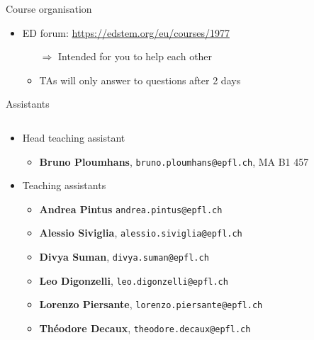 \begin{frame}{Course organisation}
\begin{itemize}
        \vspace{1em}
        \item \alert{ED forum:} \url{https://edstem.org/eu/courses/1977}
            \begin{itemize}
                \vspace{-0.2em}
                \item[$\Rightarrow$] Intended for you to help each other
                \vspace{-0.2em}
                \item TAs will only answer to questions after 2 days
            \end{itemize}
    \end{itemize}
\end{frame}

\begin{frame}{Assistants}
    \begin{columns}
    \begin{column}{1.1\textwidth}
    \begin{itemize}
        \item Head teaching assistant
            \begin{itemize}
                \item \textbf{Bruno Ploumhans}, \texttt{bruno.ploumhans@epfl.ch}, MA B1 457
            \end{itemize}
            \vspace{1.5em}
        \item Teaching assistants
            \begin{itemize}
                    \vspace{0.1em}
                    \item \textbf{Andrea Pintus} \texttt{andrea.pintus@epfl.ch}
                    \vspace{0.1em}
                    \item \textbf{Alessio Siviglia}, \texttt{alessio.siviglia@epfl.ch}
                    \vspace{0.1em}
                    \item \textbf{Divya Suman}, \texttt{divya.suman@epfl.ch}
                    \vspace{0.1em}
                    \item \textbf{Leo Digonzelli}, \texttt{leo.digonzelli@epfl.ch}
                    \vspace{0.1em}
                    \item \textbf{Lorenzo Piersante}, \texttt{lorenzo.piersante@epfl.ch}
                    \vspace{0.1em}
                    \item \textbf{Théodore Decaux}, \texttt{theodore.decaux@epfl.ch}
            \end{itemize}
    \end{itemize}
    \end{column}
    \end{columns}
\end{frame}

